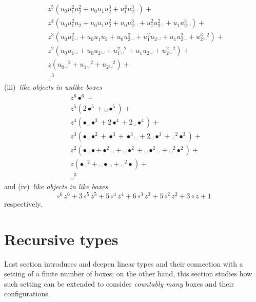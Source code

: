 \begin{example}
\begin{displaymath}
\begin{split}
&z^{5} \left(u_{0} u_{1}^{2} u_{2}^{2} + u_{0} u_{1} u_{2}^{3} + u_{1}^{2} u_{2}^{3} ␣\right) + \\
&z^{4} \left(u_{0} u_{1}^{2} u_{2} + u_{0} u_{1} u_{2}^{2} + u_{0} u_{2}^{3} ␣ + u_{1}^{2} u_{2}^{2} ␣ + u_{1} u_{2}^{3} ␣\right) + \\
&z^{3} \left(u_{0} u_{1}^{2} ␣ + u_{0} u_{1} u_{2} + u_{0} u_{2}^{2} ␣ + u_{1}^{2} u_{2} ␣ + u_{1} u_{2}^{2} ␣ + u_{2}^{3} ␣^{2}\right) + \\
&z^{2} \left(u_{0} u_{1} ␣ + u_{0} u_{2} ␣ + u_{1}^{2} ␣^{2} + u_{1} u_{2} ␣ + u_{2}^{2} ␣^{2}\right) + \\
&z \left(u_{0} ␣^{2} + u_{1} ␣^{2} + u_{2} ␣^{2}\right) + \\
&␣^{3}
\end{split}
\end{displaymath}
(iii)~\textit{like objects in unlike boxes}
\begin{displaymath}
\begin{split}
&z^{6} \bullet^{6} + \\
&z^{5} \left(2 \bullet^{5} + ␣ \bullet^{5}\right) + \\
&z^{4} \left(\bullet ␣ \bullet^{3} + 2 \bullet^{4} + 2 ␣ \bullet^{4}\right) + \\
&z^{3} \left(\bullet ␣ \bullet^{2} + \bullet^{3} + \bullet^{3} ␣ + 2 ␣ \bullet^{3} + ␣^{2} \bullet^{3}\right) + \\
&z^{2} \left(\bullet ␣ \bullet + \bullet^{2} ␣ + ␣ \bullet^{2} + ␣ \bullet^{2} ␣ + ␣^{2} \bullet^{2}\right) + \\
&z \left(\bullet ␣^{2} + ␣ \bullet ␣ + ␣^{2} \bullet\right) + \\
&␣^{3}
\end{split}
\end{displaymath}
and (iv)~\textit{like objects in like boxes}
\begin{displaymath}
\circ^{6} z^{6} + 3 \circ^{5} z^{5} + 5 \circ^{4} z^{4} + 6 \circ^{3} z^{3} + 5 \circ^{2} z^{2} + 3 \circ z + 1
\end{displaymath}
respectively.
\end{example}

\section{Recursive types}

Last section introduces and deepen linear types and their connection with a
setting of a finite number of boxes; on the other hand, this section studies
how such setting can be extended to consider \textit{countably many} boxes and
their configurations.


